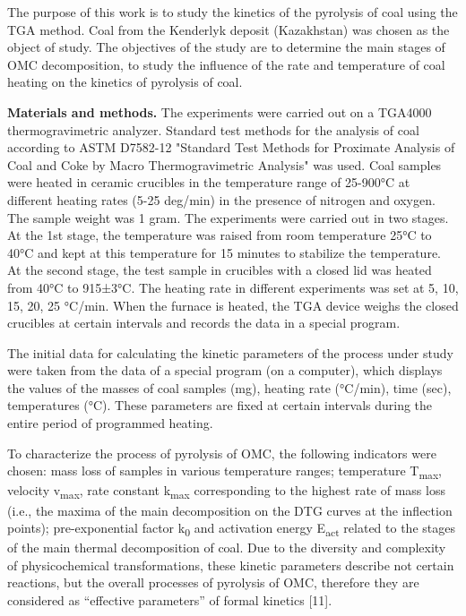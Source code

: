 \begin{multicols}{2}
The purpose of this work is to study the kinetics of the pyrolysis of
coal using the TGA method. Coal from the Kenderlyk deposit (Kazakhstan)
was chosen as the object of study. The objectives of the study are to
determine the main stages of OMC decomposition, to study the influence
of the rate and temperature of coal heating on the kinetics of pyrolysis
of coal.

{\bfseries Materials and methods.} The experiments were carried out on a
TGA4000 thermogravimetric analyzer. Standard test methods for the
analysis of coal according to ASTM D7582-12 "Standard Test Methods for
Proximate Analysis of Coal and Coke by Macro Thermogravimetric Analysis"
was used. Coal samples were heated in ceramic crucibles in the
temperature range of 25-900°C at different heating rates (5-25 deg/min)
in the presence of nitrogen and oxygen. The sample weight was 1 gram.
The experiments were carried out in two stages. At the 1st stage, the
temperature was raised from room temperature 25°C to 40°C and kept at
this temperature for 15 minutes to stabilize the temperature. At the
second stage, the test sample in crucibles with a closed lid was heated
from 40°C to 915±3°C. The heating rate in different experiments was set
at 5, 10, 15, 20, 25 °C/min. When the furnace is heated, the TGA device
weighs the closed crucibles at certain intervals and records the data in
a special program.

The initial data for calculating the kinetic parameters of the process
under study were taken from the data of a special program (on a
computer), which displays the values of the masses of coal samples (mg),
heating rate (°C/min), time (sec), temperatures (°C). These parameters
are fixed at certain intervals during the entire period of programmed
heating.

To characterize the process of pyrolysis of OMC, the following
indicators were chosen: mass loss of samples in various temperature
ranges; temperature T\textsubscript{max}, velocity v\textsubscript{max},
rate constant k\textsubscript{max} corresponding to the highest rate of
mass loss (i.e., the maxima of the main decomposition on the DTG curves
at the inflection points); pre-exponential factor k\textsubscript{0} and
activation energy E\textsubscript{act} related to the stages of the main
thermal decomposition of coal. Due to the diversity and complexity of
physicochemical transformations, these kinetic parameters describe not
certain reactions, but the overall processes of pyrolysis of OMC,
therefore they are considered as ``effective parameters'' of formal
kinetics {[}11{]}.


\end{multicols}
